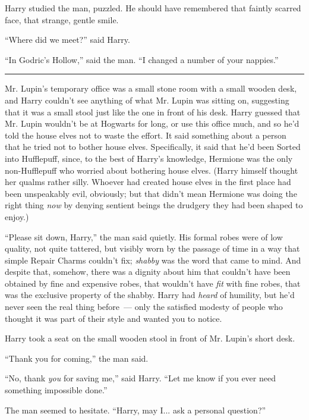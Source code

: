 Harry studied the man, puzzled. He should have remembered that faintly scarred face, that strange, gentle smile.

``Where did we meet?'' said Harry.

``In Godric's Hollow,'' said the man. ``I changed a number of your nappies.''

\begin{center}\rule{3in}{0.4pt}\end{center}

Mr. Lupin's temporary office was a small stone room with a small wooden desk, and Harry couldn't see anything of what Mr. Lupin was sitting on, suggesting that it was a small stool just like the one in front of his desk. Harry guessed that Mr. Lupin wouldn't be at Hogwarts for long, or use this office much, and so he'd told the house elves not to waste the effort. It said something about a person that he tried not to bother house elves. Specifically, it said that he'd been Sorted into Hufflepuff, since, to the best of Harry's knowledge, Hermione was the only non-Hufflepuff who worried about bothering house elves. (Harry himself thought her qualms rather silly. Whoever had created house elves in the first place had been unspeakably evil, obviously; but that didn't mean Hermione was doing the right thing \emph{now} by denying sentient beings the drudgery they had been shaped to enjoy.)

``Please sit down, Harry,'' the man said quietly. His formal robes were of low quality, not quite tattered, but visibly worn by the passage of time in a way that simple Repair Charms couldn't fix; \emph{shabby} was the word that came to mind. And despite that, somehow, there was a dignity about him that couldn't have been obtained by fine and expensive robes, that wouldn't have \emph{fit} with fine robes, that was the exclusive property of the shabby. Harry had \emph{heard} of humility, but he'd never seen the real thing before~--- only the satisfied modesty of people who thought it was part of their style and wanted you to notice.

Harry took a seat on the small wooden stool in front of Mr. Lupin's short desk.

``Thank you for coming,'' the man said.

``No, thank \emph{you} for saving me,'' said Harry. ``Let me know if you ever need something impossible done.''

The man seemed to hesitate. ``Harry, may I... ask a personal question?''

